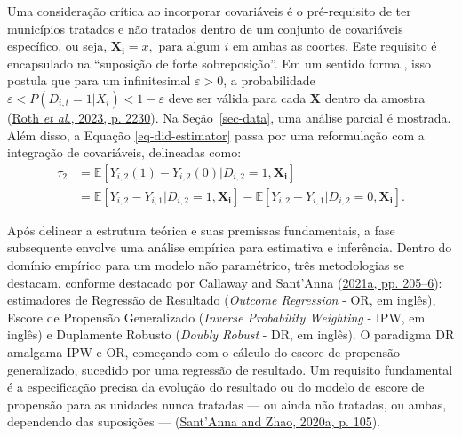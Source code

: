 \documentclass[12pt, a4paper, twoside]{article}
\numberwithin{equation}{subsection} %
\begin{document}
Uma consideração crítica ao incorporar covariáveis
\hspace{0pt}\hspace{0pt}é o pré-requisito de ter municípios tratados e
não tratados dentro de um conjunto de covariáveis
\hspace{0pt}\hspace{0pt}específico, ou seja,
\(\boldsymbol{X_i} = x, \text{ para algum } i\) em ambas as coortes.
Este requisito é encapsulado na ``suposição de forte sobreposição''. Em
um sentido formal, isso postula que para um infinitesimal
\(\varepsilon > 0\), a probabilidade
\(\varepsilon < P(D_{i,t} = 1 | X_i) < 1 - \varepsilon\) deve ser válida
para cada \(\boldsymbol{X}\) dentro da amostra
(\protect\hyperlink{ref-roth_whats_2023}{Roth \emph{et al.}, 2023, p.
2230}). Na Seção~\ref{sec-data}, uma análise parcial é mostrada. Além
disso, a Equação \eqref{eq-did-estimator} passa por uma reformulação com
a integração de covariáveis, delineadas como:
\begin{equation} \label{eq-did-estimator-covariates}
\begin{split}
    \tau_2 & = \mathbb{E}[Y_{i,2}(1) - Y_{i,2}(0) | D_{i,2} = 1, \boldsymbol{X_i}] \\
     & = \mathbb{E}[Y_{i,2} - Y_{i,1}| D_{i,2} = 1, \boldsymbol{X_i}] - \mathbb{E}[Y_{i,2} - Y_{i,1} | D_{i,2} = 0, \boldsymbol{X_i}].
\end{split}
\end{equation}

Após delinear a estrutura teórica e suas premissas fundamentais, a fase
subsequente envolve uma análise empírica para estimativa e inferência.
Dentro do domínio empírico para um modelo não paramétrico, três
metodologias se destacam, conforme destacado por Callaway and Sant'Anna
(\protect\hyperlink{ref-CALLAWAY2021200}{2021a, pp. 205--6}):
estimadores de Regressão de Resultado (\textit{Outcome Regression} - OR,
em inglês), Escore de Propensão Generalizado
(\textit{Inverse Probability Weighting} - IPW, em inglês) e Duplamente
Robusto (\textit{Doubly Robust} - DR, em inglês). O paradigma DR
amalgama IPW e OR, começando com o cálculo do escore de propensão
generalizado, sucedido por uma regressão de resultado. Um requisito
fundamental é a especificação precisa da evolução do resultado ou do
modelo de escore de propensão para as unidades nunca tratadas --- ou
ainda não tratadas, ou ambas, dependendo das suposições ---
(\protect\hyperlink{ref-SANTANNA2020101}{Sant'Anna and Zhao, 2020a, p.
105}).
\end{document}
